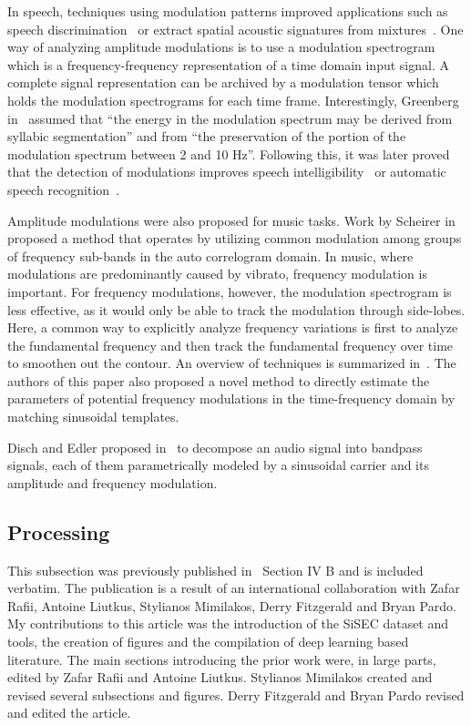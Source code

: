 In speech, techniques using modulation patterns improved applications such as speech  discrimination~\cite{mesgarani04} or extract spatial acoustic signatures from mixtures~\cite{sukittanon06}.
One way of analyzing amplitude modulations is to use a modulation spectrogram~\cite{greenberg97} which is a frequency-frequency representation of a time domain input signal.
A complete signal representation can be archived by a modulation tensor which holds the modulation spectrograms for each time frame.
Interestingly, Greenberg in~\cite{greenberg97} assumed that ``the energy in the modulation spectrum may be derived from syllabic segmentation'' and from ``the preservation of the portion of the modulation spectrum between 2 and 10 Hz''.
Following this, it was later proved that the detection of modulations improves speech intelligibility~\cite{elhilali03} or automatic speech recognition~\cite{kingsbury98}.
\par
Amplitude modulations were also proposed for music tasks. 
Work by Scheirer in~\cite{scheirer99} proposed a method that operates by utilizing common modulation among groups of frequency sub-bands in the auto correlogram domain.
In music, where modulations are predominantly caused by vibrato, frequency modulation is important.
For frequency modulations, however, the modulation spectrogram is less effective, as it would only be able to track the modulation through side-lobes.
Here, a common way to explicitly analyze frequency variations is first to analyze the fundamental frequency and then track the fundamental frequency over time to smoothen out the contour.
An overview of techniques is summarized in~\cite{driedger16}.
The authors of this paper also proposed a novel method to directly estimate the parameters of potential frequency modulations in the time-frequency domain by matching sinusoidal templates.
\par
Disch and Edler proposed in~\cite{disch09} to decompose an audio signal into bandpass signals, each of them parametrically modeled by a sinusoidal carrier and its amplitude and frequency modulation.

\subsection{Processing}

\begin{shaded}
This subsection was previously published in~\cite{rafii} Section IV B and is included verbatim. The publication is a result of an international collaboration with Zafar Rafii, Antoine Liutkus, Stylianos Mimilakos, Derry Fitzgerald and Bryan Pardo. 
My contributions to this article was the introduction of the SiSEC dataset and tools, the creation of figures and the compilation of deep learning based literature.
The main sections introducing the prior work were, in large parts, edited by Zafar Rafii and Antoine Liutkus. Stylianos Mimilakos created and revised several subsections and figures. Derry Fitzgerald and Bryan Pardo revised and edited the article.
\end{shaded}

